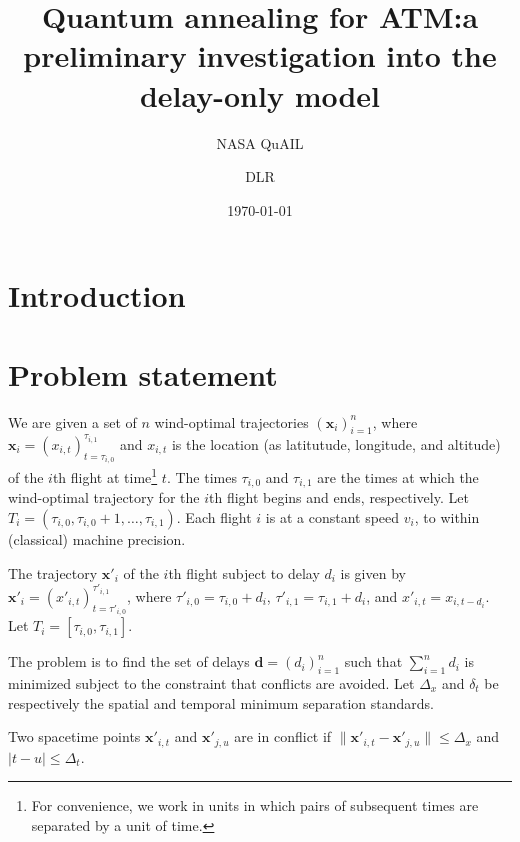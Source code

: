 \documentclass[twocolumn]{article}
\date{\today}
\author{NASA QuAIL \and DLR}
\title{Quantum annealing for ATM:\@ a preliminary investigation into the delay-only model}
\begin{document}
\maketitle

\section{Introduction}

\section{Problem statement}

We are given a set of $n$ wind-optimal trajectories 
${\left(\mathbf{x}_i\right)}_{i=1}^n$, 
where 
$\mathbf{x}_i = {\left(x_{i,t}\right)}_{t=\tau_{i,0}}^{\tau_{i,1}}$ 
and 
$x_{i, t}$ is the location (as latitutude, longitude, and altitude) of the $i$th flight at time\footnote{For convenience, we work in units in which pairs of subsequent times are separated by a unit of time.} $t$.
The times $\tau_{i,0}$ and $\tau_{i, 1}$ are the times at which the wind-optimal trajectory for the $i$th flight begins and ends, respectively.
Let $T_i = \left(\tau_{i, 0}, \tau_{i, 0} + 1, \ldots, \tau_{i, 1}\right)$.
Each flight $i$ is at a constant speed $v_i$, to within (classical) machine precision.

The trajectory $\mathbf{x}'_i$ of the $i$th flight subject to delay $d_i$ is given by
$\mathbf{x}'_i = {\left(x'_{i,t}\right)}_{t=\tau'_{i,0}}^{\tau'_{i,1}}$,
where 
$\tau'_{i,0} = \tau_{i,0} + d_i$,
$\tau'_{i,1} = \tau_{i,1} + d_i$, and
${x'}_{i,t} = x_{i, t - d_i}$.
Let $T_i = [\tau_{i, 0}, \tau_{i, 1}]$.

The problem is to find the set of delays 
$\mathbf d = {\left(d_i\right)}_{i=1}^n$ such that $\sum_{i=1}^n d_i$ is minimized subject to the constraint that conflicts are avoided.
Let $\Delta_x$ and $\delta_t$ be respectively the spatial and temporal minimum separation standards. 

Two spacetime points $\mathbf x'_{i,t}$ and $\mathbf x'_{j,u}$ are in conflict if 
$\|\mathbf x'_{i,t} - \mathbf x'_{j,u}\| \leq \Delta_x$ and $|t - u| \leq \Delta_t$.
\end{document}
